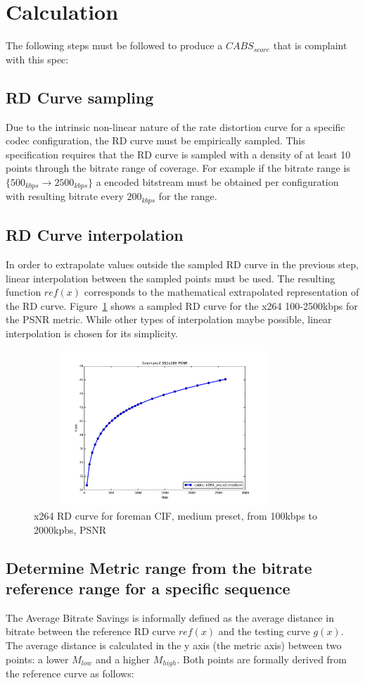 \documentclass[10pt, conference, hidelinks, onecolumn]{IEEEtran}
\begin{document}
\section{Calculation}
The following steps must be followed to produce a $CABS_{score}$ that is complaint with this spec:
\subsection{RD Curve sampling}
Due to the intrinsic non-linear nature of the rate distortion curve for a specific codec configuration, the RD curve must be empirically sampled. This specification requires that the RD curve is sampled with a density of at least 10 points through the bitrate range of coverage. For example if the bitrate range is $\lbrace 500_{kbps} \to 2500_{kbps} \rbrace $ a encoded bitstream must be obtained per configuration with resulting bitrate every $200_{kbps}$ for the range.


\subsection{RD Curve interpolation}
In order to extrapolate values outside the sampled RD curve in the previous step, linear interpolation between the sampled points must be used. The resulting function $ref(x)$ corresponds to the mathematical extrapolated representation of the RD curve. Figure~\ref{fig:x264rd} shows a sampled RD curve for the x264 100-2500kbps for the PSNR metric. While other types of interpolation maybe possible, linear interpolation is chosen for its simplicity.

\begin{figure}[!ht]
\centering
\includegraphics[width=3.8in,height=2.3in]{x264_rd}
\caption{x264 RD curve for foreman CIF, medium preset, from 100kbps to 2000kpbs, PSNR}
\label{fig:x264rd}
\end{figure}

\subsection{Determine Metric range from the bitrate reference range for a specific sequence}
The Average Bitrate Savings is informally defined as the average distance in bitrate between the reference RD curve $ref(x)$ and the testing curve $g(x)$. The average distance is calculated in the y axis (the metric axis) between two points: a lower $M_{low}$ and a higher $M_{high}$. Both points are formally derived from the reference curve as follows: 
\end{document}
